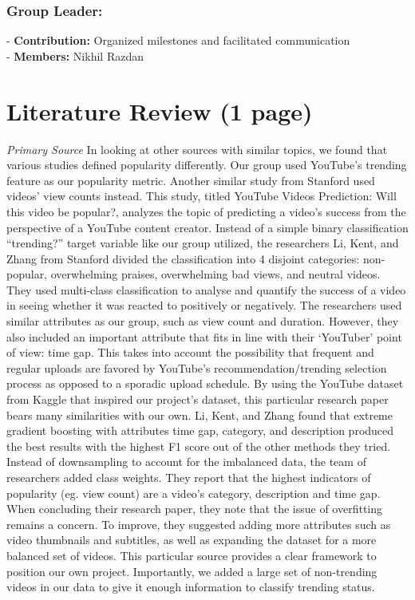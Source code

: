\documentclass{article}
\begin{document}
\subsubsection*{Group Leader:}
- \textbf{Contribution:} Organized milestones and facilitated communication \\
- \textbf{Members:} Nikhil Razdan

\section*{Literature Review (1 page)}
\textit{Primary Source}
In looking at other sources with similar topics, we found that various studies defined popularity differently. Our group used YouTube’s trending feature as our popularity metric. Another similar study from Stanford used videos’ view counts instead. This study, titled YouTube Videos Prediction: Will this video be popular?, analyzes the topic of predicting a video’s success from the perspective of a YouTube content creator. Instead of a simple binary classification “trending?” target variable like our group utilized, the researchers Li, Kent, and Zhang from Stanford divided the classification into 4 disjoint categories: non-popular, overwhelming praises, overwhelming bad views, and neutral videos. They used multi-class classification to analyse and quantify the success of a video in seeing whether it was reacted to positively or negatively. The researchers used similar attributes as our group, such as view count and duration. However, they also included an important attribute that fits in line with their ‘YouTuber’ point of view: time gap. This takes into account the possibility that frequent and regular uploads are favored by YouTube’s recommendation/trending selection process as opposed to a sporadic upload schedule. By using the YouTube dataset from Kaggle that inspired our project’s dataset, this particular research paper bears many similarities with our own. 
Li, Kent, and Zhang found that extreme gradient boosting with attributes {time gap, category, and description} produced the best results with the highest F1 score out of the other methods they tried. Instead of downsampling to account for the imbalanced data, the team of researchers added class weights. They report that the highest indicators of popularity (eg. view count) are a video’s category, description and time gap. When concluding their research paper, they note that the issue of overfitting remains a concern. To improve, they suggested adding more attributes such as video thumbnails and subtitles, as well as expanding the dataset for a more balanced set of videos. This particular source provides a clear framework to position our own project. Importantly, we added a large set of non-trending videos in our data to give it enough information to classify trending status.
\end{document}
